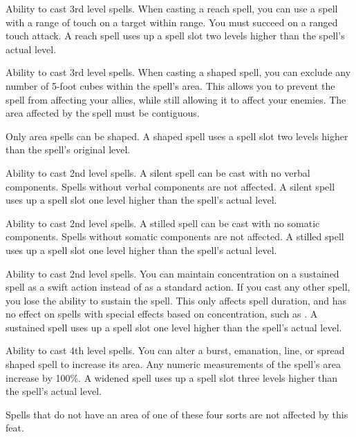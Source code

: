  Ability to cast 3rd level spells.
 When casting a reach spell, you can use a spell with a range of touch on a target within \rngclose range. You must succeed on a ranged touch attack. A reach spell uses up a spell slot two levels higher than the spell's actual level.

 Ability to cast 3rd level spells.
 When casting a shaped spell, you can exclude any number of 5-foot cubes within the spell's area. This allows you to prevent the spell from affecting your allies, while still allowing it to affect your enemies. The area affected by the spell must be contiguous.

Only area spells can be shaped. A shaped spell uses a spell slot two levels higher than the spell's original level.

 Ability to cast 2nd level spells.
 A silent spell can be cast with no verbal components. Spells without verbal components are not affected. A silent spell uses up a spell slot one level higher than the spell's actual level.

 Ability to cast 2nd level spells.
 A stilled spell can be cast with no somatic components. Spells without somatic components are not affected. A stilled spell uses up a spell slot one level higher than the spell's actual level.

\featpre Ability to cast 2nd level spells.
\featben You can maintain concentration on a sustained spell as a swift action instead of as a standard action. If you cast any other spell, you lose the ability to sustain the spell. This only affects spell duration, and has no effect on spells with special effects based on concentration, such as . A sustained spell uses up a spell slot one level higher than the spell's actual level.

 Ability to cast 4th level spells.
 You can alter a burst, emanation, line, or spread shaped spell to increase its area. Any numeric measurements of the spell's area increase by 100\%. A widened spell uses up a spell slot three levels higher than the spell's actual level.
\par Spells that do not have an area of one of these four sorts are not affected by this feat.


